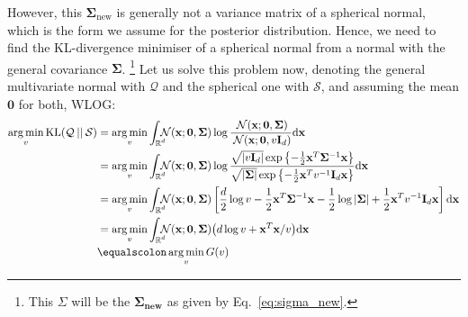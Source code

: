 \documentclass[11pt]{article}
\newcommand{\vek}[1]{\ensuremath{\mathbf{#1}}}
\newcommand{\byd}{\ensuremath{\mathrm{d}}}
\newcommand{\norm}{\ensuremath{\:\mathcal{N}}}
\newcommand{\unity}{\ensuremath{\mathbf{I}}}
\newcommand{\real}{\ensuremath{\mathbb{R}}}
\DeclareMathOperator*{\argmin}{arg\,min}
\newcommand{\intrcc}{\ensuremath{\int_{\rlap{\scriptsize$\real^d$}}}}
\begin{document}
However, this $\vek{\Sigma}_{\text{new}}$ is generally not a variance 
matrix of a spherical normal, which is the form we assume for the 
posterior distribution.
Hence, we need to find the KL-divergence minimiser of a spherical normal 
from a normal with the general covariance $\vek{\Sigma}$.%
\footnote{This $\Sigma$ will be the $\vek{\Sigma_{\text{new}}}$ as given by 
Eq.~\eqref{eq:sigma_new}.} %
Let us solve this problem now, denoting the general multivariate normal 
with $\mathcal{Q}$ and the spherical one with $\mathcal{S}$, and 
assuming the mean $\vek{0}$ for both, WLOG:
\begin{align}
	\argmin_v \text{KL}(\mathcal{Q}\:||\:\mathcal{S}) &= %
	\argmin_v \intrcc
		\norm(\vek{x}; \vek{0}, \vek{\Sigma})
		\log \frac{\norm(\vek{x}; \vek{0}, \vek{\Sigma})}
							{\norm(\vek{x}; \vek{0}, v\unity_d)}  \byd \vek{x} \\
	&= \argmin_v \intrcc
		\norm(\vek{x}; \vek{0}, \vek{\Sigma})
		\log\frac{\sqrt{|v\unity_d|}\exp\left\{-\frac{1}{2}\vek{x}^T\vek{\Sigma}^{-1}\vek{x}\right\}}
		         {\sqrt{|\vek{\Sigma}|}\exp\left\{-\frac{1}{2}\vek{x}^T v^{-1}\unity_d \vek{x}\right\}}
						 \byd \vek{x} \\
	&= \argmin_v \intrcc
		\norm(\vek{x}; \vek{0}, \vek{\Sigma})
	\left[\frac{d}{2}\log v - \frac{1}{2}\vek{x}^T\vek{\Sigma}^{-1}\vek{x}
				- \frac{1}{2}\log|\vek{\Sigma}| + \frac{1}{2}\vek{x}^Tv^{-1}\unity_d \vek{x}
	\right]\byd \vek{x} \\
	&= \argmin_v \intrcc
		\norm(\vek{x}; \vek{0}, \vek{\Sigma})
		\big(d\log v + \vek{x}^T\vek{x}/v\big)\byd \vek{x} \\
	&\equalscolon \argmin_v G(v)
\end{align}
\end{document}
